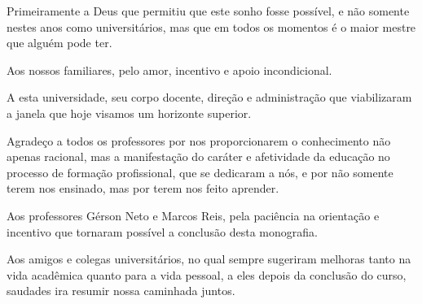 Primeiramente a Deus que permitiu que este sonho fosse possível, e não somente nestes anos como universitários, mas que em todos os momentos é o maior mestre que alguém pode ter.
	
Aos nossos familiares, pelo amor, incentivo e apoio incondicional.

A esta universidade, seu corpo docente, direção e administração que viabilizaram a janela que hoje visamos um horizonte superior.

Agradeço a todos os professores por nos proporcionarem o conhecimento não apenas racional, mas a manifestação do caráter e afetividade da educação no processo de formação profissional, que se dedicaram a nós, e por não somente terem nos ensinado, mas por terem nos feito aprender.

Aos professores Gérson Neto e Marcos Reis, pela paciência na orientação e incentivo que tornaram possível a conclusão desta monografia. 

Aos amigos e colegas universitários, no qual sempre sugeriram melhoras tanto na vida acadêmica quanto para a vida pessoal, a eles depois da conclusão do curso, saudades ira resumir nossa caminhada juntos. 